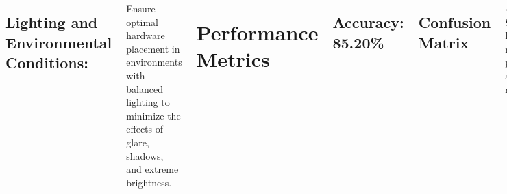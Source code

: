 \documentclass[25pt,a0paper, portrait]{tikzposter}
\begin{document}
\begin{columns}
{	\subsection*{Lighting and Environmental Conditions:}
	Ensure optimal hardware placement in environments with balanced lighting to minimize the effects of glare, shadows, and extreme brightness.

			
		}
		
		
		

		{
		\section*{Performance Metrics}			
		\subsection*{Accuracy: 
			85.20\% \newline}
	
	
		\subsection*{Confusion Matrix}
		\textbf{<F1 Score> } Harmonic mean of precision and recall.
		
		\begin{tikzfigure}
		
			\includegraphics[width=\linewidth]{images/Interpretation}
		
		\end{tikzfigure}
	
}
		{
			\begin{itemize}
				\item Once the model is successfully uploaded to the device, inference is triggered using the Edge Impulse command. 
				\item This process generates local visualizations on the host machine, providing a graphical user interface (GUI) for face recognition, as illustrated below.
			\end{itemize}

}
\end{columns}
\end{document}
